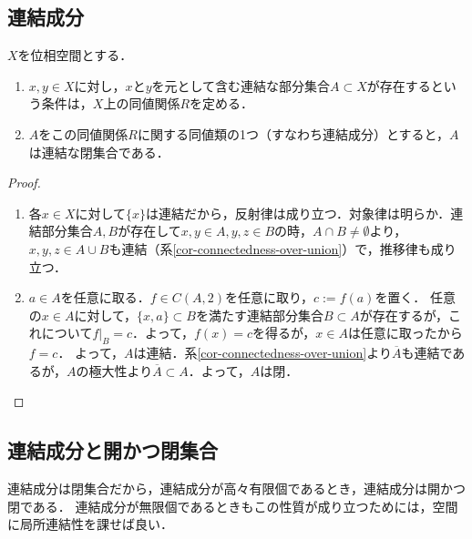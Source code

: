 \documentclass[uplatex,dvipdfmx]{jsreport}
\begin{document}
\subsection{連結成分}

\begin{proposition}[連結成分は閉集合]\label{prop-connected-component}
    $X$を位相空間とする．
    \begin{enumerate}
        \item $x,y\in X$に対し，$x$と$y$を元として含む連結な部分集合$A\subset X$が存在するという条件は，$X$上の同値関係$R$を定める．
        \item $A$をこの同値関係$R$に関する同値類の1つ（すなわち連結成分）とすると，$A$は連結な閉集合である．
    \end{enumerate}
\end{proposition}
\begin{proof}\mbox{}
    \begin{enumerate}
        \item 各$x\in X$に対して$\{x\}$は連結だから，反射律は成り立つ．対象律は明らか．連結部分集合$A,B$が存在して$x,y\in A,y,z\in B$の時，$A\cap B\ne\emptyset$より，$x,y,z\in A\cup B$も連結（系\ref{cor-connectedness-over-union}）で，推移律も成り立つ．
        \item $a\in A$を任意に取る．$f\in C(A,2)$を任意に取り，$c:=f(a)$を置く．
        任意の$x\in A$に対して，$\{x,a\}\subset B$を満たす連結部分集合$B\subset A$が存在するが，これについて$f|_B=c$．よって，$f(x)=c$を得るが，$x\in A$は任意に取ったから$f=c$．
        よって，$A$は連結．系\ref{cor-connectedness-over-union}より$\overline{A}$も連結であるが，$A$の極大性より$\overline{A}\subset A$．よって，$A$は閉．
    \end{enumerate}
\end{proof}

\subsection{連結成分と開かつ閉集合}

\begin{tcolorbox}[colframe=ForestGreen, colback=ForestGreen!10!white,breakable,colbacktitle=ForestGreen!40!white,coltitle=black,fonttitle=\bfseries\sffamily,
title=]
    連結成分は閉集合だから，連結成分が高々有限個であるとき，連結成分は開かつ閉である．
    連結成分が無限個であるときもこの性質が成り立つためには，空間に局所連結性を課せば良い．
\end{tcolorbox}
\end{document}
